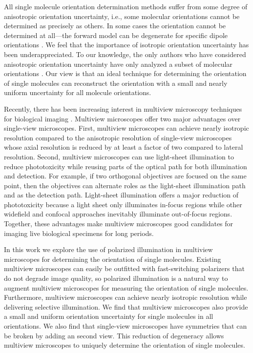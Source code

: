 \documentclass[10pt]{article}
\begin{document}
All single molecule orientation determination methods suffer from some degree of
anisotropic orientation uncertainty, i.e., some molecular orientations cannot be
determined as precisely as others. In some cases the orientation cannot be
determined at all---the forward model can be degenerate for specific dipole
orientations \cite{fourkas2001, lu2008}. We feel that the importance of
isotropic orientation uncertainty has been underappreciated. To our knowledge,
the only authors who have considered anisotropic orientation uncertainty have
only analyzed a subset of molecular orientations \cite{agrawal2012}. Our view is
that an ideal technique for determining the orientation of single molecules can
reconstruct the orientation with a small and nearly uniform uncertainty for all
molecule orientations.

Recently, there has been increasing interest in multiview microscopy techniques
for biological imaging \cite{wu2013, keller2015, wu2016, wu2017}. Multiview
microscopes offer two major advantages over single-view microscopes. First,
multiview microscopes can achieve nearly isotropic resolution compared to the
anisotropic resolution of single-view microscopes whose axial resolution is
reduced by at least a factor of two compared to lateral resolution. Second,
multiview microscopes can use light-sheet illumination to reduce phototoxicity
while reusing parts of the optical path for both illumination and detection. For
example, if two orthogonal objectives are focused on the same point, then the
objectives can alternate roles as the light-sheet illumination path and as the
detection path. Light-sheet illumination offers a major reduction of
phototoxicity because a light sheet only illuminates in-focus regions while
other widefield and confocal approaches inevitably illuminate out-of-focus
regions. Together, these advantages make multiview microscopes good candidates
for imaging live biological specimens for long periods.

In this work we explore the use of polarized illumination in multiview
microscopes for determining the orientation of single molecules. Existing
multiview microscopes can easily be outfitted with fast-switching polarizers
that do not degrade image quality, so polarized illumination is a natural way to
augment multiview microscopes for measuring the orientation of single
molecules. Furthermore, multiview microscopes can achieve nearly isotropic
resolution while delivering selective illumination. We find that multiview
microscopes also provide a small and uniform orientation uncertainty for single
molecules in all orientations. We also find that single-view microscopes have
symmetries that can be broken by adding an second view. This reduction of
degeneracy allows multiview microscopes to uniquely determine the orientation of
single molecules.
\end{document}
